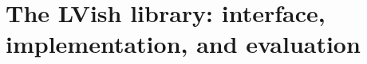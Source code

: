\chapter{The LVish library: interface, implementation, and evaluation}\label{ch:lvish} %














